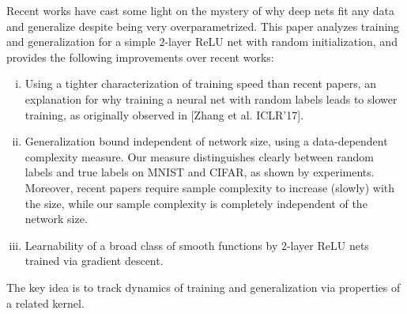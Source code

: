 
Recent works have cast some light on the mystery of why deep nets fit any data and generalize despite being very overparametrized. This paper analyzes training and generalization for a simple $2$-layer ReLU net with random initialization, and provides the following improvements over
recent works:

 \begin{enumerate}[(i)]
 \item Using a tighter characterization of training speed than recent papers, an explanation for why training a neural net with random labels leads to slower training, as originally observed in  [Zhang et al. ICLR'17]. 
 \item Generalization bound independent of network size, using a data-dependent complexity measure. 
  Our measure distinguishes clearly between random labels and true labels on MNIST and CIFAR, as shown by experiments. 
  Moreover, recent papers require sample complexity to increase (slowly) with the size, while our sample complexity is completely independent of the network size.

 \item Learnability of a broad class of smooth functions %
  by $2$-layer ReLU nets trained via gradient descent.
 \end{enumerate}
 
The key idea is to track dynamics of training and generalization via properties of a related kernel. 
 
\iffalse 
It was recently proved that over-parameterized neural networks with sufficiently large width trained with randomly initialized gradient descent (GD) can achieve zero training loss on any non-degenerate data.
However, this result holds even for arbitrary labels (including random labels) and thus cannot explain the generalization behavior of solutions found by GD.
In this work, we give a fine-grained analysis to characterize the optimization and generalization performance of two-layer over-parameterized ReLU activated neural networks trained with GD. This analysis  \begin{enumerate}[(i)]
	\item explains why training a neural network with random labels is slower than with true labels, as observed in~\cite{zhang2016understanding}, 
	\item yields a generalization bound for the solution found by GD, which is independent of the number of parameters in the network and only depends on a data-dependent complexity measure that can clearly distinguish random labels and true labels on MNIST and CIFAR datasets, and
	\item implies that two-layer neural nets can provably learn a broad class of smooth functions via GD. %
\end{enumerate}
\fi 

